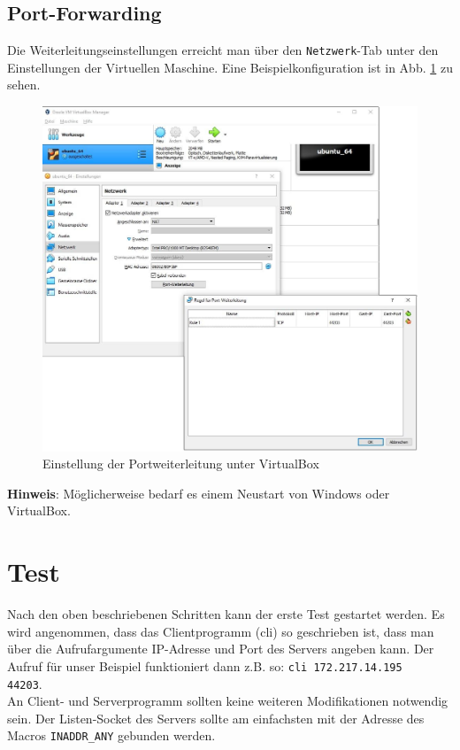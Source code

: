 \documentclass[11pt, a4paper]{article}
\newcommand{\code}[1]{{\lstinline{#1}}}
\begin{document}
\subsection{Port-Forwarding}

Die Weiterleitungseinstellungen erreicht man über den \code{Netzwerk}-Tab unter
den Einstellungen der Virtuellen Maschine. Eine Beispielkonfiguration ist in
Abb. \ref{vm_port_fw} zu sehen.

\begin{figure}[H]
\centering
\includegraphics[width=\textwidth]{graphics/vm_port_fw}
\caption{Einstellung der Portweiterleitung unter VirtualBox}\label{vm_port_fw}
\end{figure}

\textbf{Hinweis}: Möglicherweise bedarf es einem Neustart von Windows oder
VirtualBox.

\section{Test}
Nach den oben beschriebenen Schritten kann der erste Test gestartet werden.
Es wird angenommen, dass das Clientprogramm (cli) so geschrieben ist, dass man
über die Aufrufargumente IP-Adresse und Port des Servers angeben kann. Der
Aufruf für unser Beispiel funktioniert dann z.B. so: \code{cli 172.217.14.195
  44203}.\\

An Client- und Serverprogramm sollten keine weiteren Modifikationen
notwendig sein. Der Listen-Socket des Servers sollte am einfachsten mit der
Adresse des Macros \code{INADDR_ANY} gebunden werden.
\end{document}
